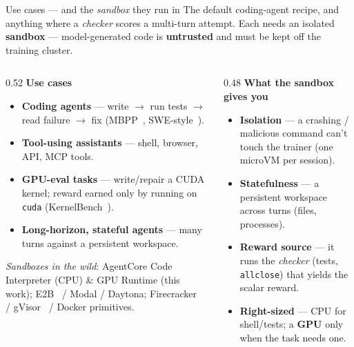 \documentclass[aspectratio=169]{beamer}
\begin{document}
\begin{frame}{Use cases --- and the \emph{sandbox} they run in}
  \footnotesize The default coding-agent recipe, and anything where a \emph{checker} scores a
  multi-turn attempt. Each needs an isolated \textbf{sandbox} --- model-generated code is
  \textbf{untrusted} and must be kept off the training cluster.
  \vspace{0.1em}
  \begin{columns}[T]
    \begin{column}{0.52\textwidth}
      \textbf{Use cases}
      \begin{itemize}\setlength\itemsep{0.12em}
        \item \textbf{Coding agents} --- write $\to$ run tests $\to$ read failure $\to$ fix
          (MBPP~\cite{mbpp}, SWE-style~\cite{swebench}).
        \item \textbf{Tool-using assistants} --- shell, browser, API, MCP tools.
        \item \textbf{GPU-eval tasks} --- write/repair a CUDA kernel; reward earned only by running
          on \texttt{cuda} (KernelBench~\cite{kernelbench}).
        \item \textbf{Long-horizon, stateful agents} --- many turns against a persistent workspace.
      \end{itemize}
      \vspace{0.25em}
      {\scriptsize \emph{Sandboxes in the wild}: AgentCore Code Interpreter (CPU) \& GPU Runtime
      (this work); E2B~\cite{e2b} / Modal / Daytona; Firecracker~\cite{firecracker} / gVisor~\cite{gvisor}
      / Docker primitives.}
    \end{column}
    \begin{column}{0.48\textwidth}
      \textbf{What the sandbox gives you}
      \begin{itemize}\setlength\itemsep{0.12em}
        \item \textbf{Isolation} --- a crashing / malicious command can't touch the trainer (one microVM per session).
        \item \textbf{Statefulness} --- a persistent workspace across turns (files, processes).
        \item \textbf{Reward source} --- it runs the \emph{checker} (tests, \texttt{allclose}) that yields the scalar reward.
        \item \textbf{Right-sized} --- CPU for shell/tests; a \textbf{GPU} only when the task needs one.
      \end{itemize}
      \vspace{0.15em}

\end{column}
\end{columns}
\end{frame}
\end{document}
